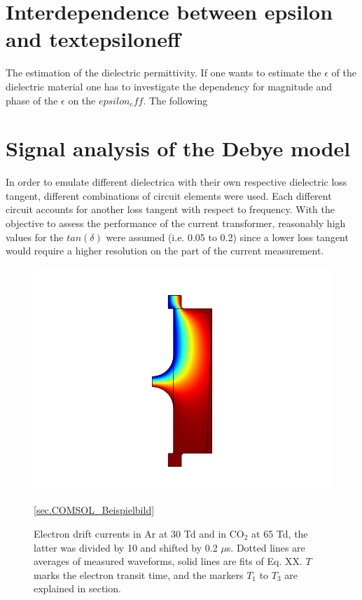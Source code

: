 \section{Interdependence between epsilon and textepsiloneff} 
The estimation of the dielectric permittivity. If one wants to estimate the $\epsilon$ of the dielectric material one has to investigate the dependency for  magnitude and phase of the $\epsilon$ on the $epsilon_eff$. The following 

\section{Signal analysis of the Debye model}

In order to emulate different dielectrica with their own respective dielectric loss tangent, different combinations of circuit elements were used. Each different circuit accounts for another loss tangent with respect to frequency. With the objective to assess the performance of the current transformer, reasonably high values for the $tan\left(\delta\right)$ were assumed (i.e. 0.05 to 0.2) since a lower loss tangent would require a higher resolution on the part of the current measurement.


\begin{figure}[htbp]
	\centering
	\includegraphics{figures/COMSOL_Beispielbild.jpg}		
	\caption[Kurze Abbildungsbeschreibung]{Electron drift currents in Ar at 30 Td and in CO$_2$ at 65 Td, the latter was divided by 10 and shifted by 0.2 $\mu$s. Dotted lines are averages of measured waveforms, solid lines are fits of Eq. XX. $T$ marks the electron transit time, and the markers $T_1$ to $T_3$ are explained in section.} \ref{sec.COMSOL_Beispielbild}
	\label{fig.waveforms}
\end{figure}


